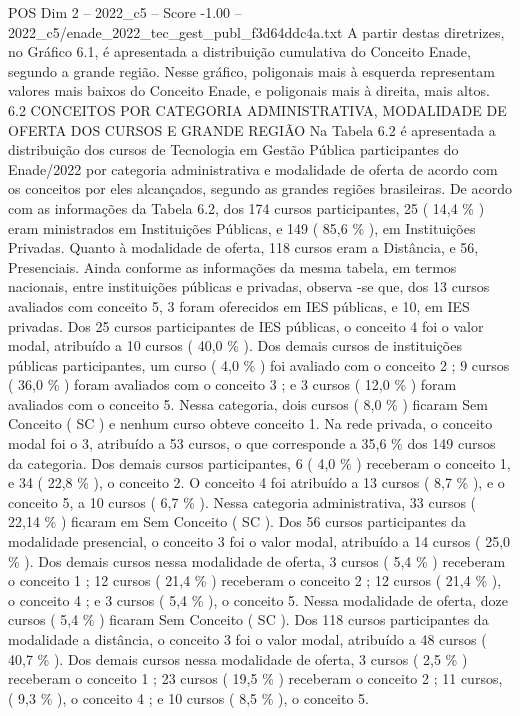 \begin{textsample}{POS Dim 2 – 2022\_c5 – Score -1.00 – 2022\_c5/enade\_2022\_tec\_gest\_publ\_f3d64ddc4a.txt}
A partir destas diretrizes, no Gráfico 6.1, é apresentada a distribuição cumulativa do Conceito Enade, segundo a grande região.
Nesse gráfico, poligonais mais à esquerda representam valores mais baixos do Conceito Enade, e poligonais mais à direita, mais altos. 6.2 CONCEITOS POR CATEGORIA ADMINISTRATIVA, MODALIDADE DE OFERTA DOS CURSOS E GRANDE REGIÃO Na Tabela 6.2 é apresentada a distribuição dos cursos de Tecnologia em Gestão Pública participantes do Enade/2022 por categoria administrativa e modalidade de oferta de acordo com os conceitos por eles alcançados, segundo as grandes regiões brasileiras.
De acordo com as informações da Tabela 6.2, dos 174 cursos participantes, 25 ( 14,4 \% ) eram ministrados em Instituições Públicas, e 149 ( 85,6 \% ), em Instituições Privadas.
Quanto à modalidade de oferta, 118 cursos eram a Distância, e 56, Presenciais.
Ainda conforme as informações da mesma tabela, em termos nacionais, entre instituições públicas e privadas, observa -se que, dos 13 cursos avaliados com conceito 5, 3 foram oferecidos em IES públicas, e 10, em IES privadas.
Dos 25 cursos participantes de IES públicas, o conceito 4 foi o valor modal, atribuído a 10 cursos ( 40,0 \% ).
Dos demais cursos de instituições públicas participantes, um curso ( 4,0 \% ) foi avaliado com o conceito 2 ; 9 cursos ( 36,0 \% ) foram avaliados com o conceito 3 ; e 3 cursos ( 12,0 \% ) foram avaliados com o conceito 5.
Nessa categoria, dois cursos ( 8,0 \% ) ficaram Sem Conceito ( SC ) e nenhum curso obteve conceito 1.
Na rede privada, o conceito modal foi o 3, atribuído a 53 cursos, o que corresponde a 35,6 \% dos 149 cursos da categoria.
Dos demais cursos participantes, 6 ( 4,0 \% ) receberam o conceito 1, e 34 ( 22,8 \% ), o conceito 2.
O conceito 4 foi atribuído a 13 cursos ( 8,7 \% ), e o conceito 5, a 10 cursos ( 6,7 \% ).
Nessa categoria administrativa, 33 cursos ( 22,14 \% ) ficaram em Sem Conceito ( SC ).
Dos 56 cursos participantes da modalidade presencial, o conceito 3 foi o valor modal, atribuído a 14 cursos ( 25,0 \% ).
Dos demais cursos nessa modalidade de oferta, 3 cursos ( 5,4 \% ) receberam o conceito 1 ; 12 cursos ( 21,4 \% ) receberam o conceito 2 ; 12 cursos ( 21,4 \% ), o conceito 4 ; e 3 cursos ( 5,4 \% ), o conceito 5.
Nessa modalidade de oferta, doze cursos ( 5,4 \% ) ficaram Sem Conceito ( SC ).
Dos 118 cursos participantes da modalidade a distância, o conceito 3 foi o valor modal, atribuído a 48 cursos ( 40,7 \% ).
Dos demais cursos nessa modalidade de oferta, 3 cursos ( 2,5 \% ) receberam o conceito 1 ; 23 cursos ( 19,5 \% ) receberam o conceito 2 ; 11 cursos, ( 9,3 \% ), o conceito 4 ; e 10 cursos ( 8,5 \% ), o conceito 5.

\end{textsample}
